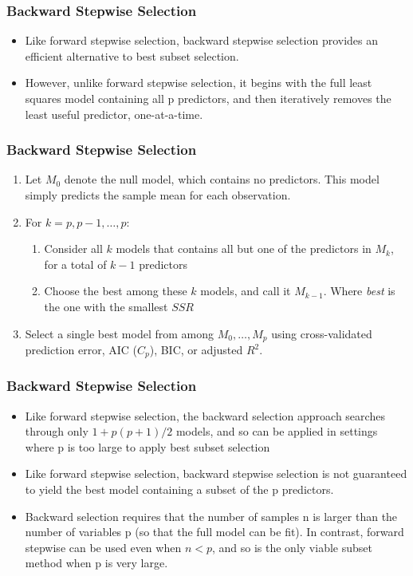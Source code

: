 \documentclass[
  shownotes,
  xcolor={svgnames},
  hyperref={colorlinks,citecolor=DarkBlue,linkcolor=DarkRed,urlcolor=DarkBlue}
  ]{beamer}
\begin{document}
\begin{frame}[fragile]
\frametitle{Backward Stepwise Selection}

\begin{itemize}
\item Like forward stepwise selection, backward stepwise selection provides an efficient alternative to best subset selection.
\bigskip
\item However, unlike forward stepwise selection, it begins with the full least squares model containing all p predictors, and then iteratively removes the least useful predictor, one-at-a-time.
\end{itemize}

\end{frame}
\begin{frame}[fragile]
\frametitle{Backward Stepwise Selection}


\begin{enumerate}
\item Let $M_0$ denote the null model, which contains no predictors. This model simply predicts the sample mean for each observation.
\bigskip

\item  For $k=p,p-1,\dots,p$:
\medskip
\begin{enumerate}
\item Consider all $k$  models that contains all but one of the predictors in $M_k$, for a total of $k-1$ predictors
\medskip
\item Choose the best among these $k$ models, and call it $M_{k-1}$. Where {\it best} is the one with the smallest $SSR$
\end{enumerate}
\bigskip
\item Select a single best model from among $M_0,\dots, M_p$ using cross-validated prediction error, AIC ($C_p$), BIC, or adjusted $R^2$.
\end{enumerate}

\end{frame}
\begin{frame}[fragile]
\frametitle{Backward Stepwise Selection}

\begin{itemize}
\item Like forward stepwise selection, the backward selection approach searches through only $1 + p(p + 1)/2$ models, and so can be applied in settings where p is too large to apply best subset selection
\item  Like forward stepwise selection, backward stepwise selection is not guaranteed to yield the best model containing a subset of the p predictors.
\item  Backward selection requires that the number of samples n is larger than the number of variables p (so that the full model can be fit). In contrast, forward stepwise can be used even when $n < p$, and so is the only viable subset method when p is very large.
\end{itemize}

\end{frame}
\end{document}
